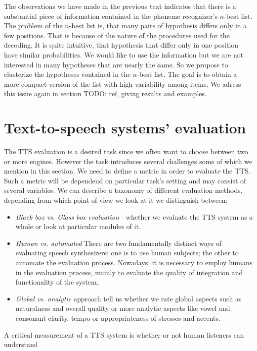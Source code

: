 \par
The observations we have made in the previous text indicates that there is a substantial piece of information contained in the phoneme recognizer's $n$-best list.
The problem of the $n$-best list is, that many pairs of hypothesis differs only in a few positions.
That is because of the nature of the procedures used for the decoding.
It is quite intuitive, that hypothesis that differ only in one position have similar probabilities.
We would like to use the information but we are not interested in many hypotheses that are nearly the same.
So we propose to clusterize the hypotheses contained in the $n$-best list.
The goal is to obtain a more compact version of the list with high variability among items.
We adress this issue again in section TODO: ref, giving results and examples.  
\section{Text-to-speech systems' evaluation}
\label{tts-eval}
The TTS evaluation\cite{huang2001spoken} is a desired task since we often want to choose between two or more engines.
However the task introduces several challenges some of which we mention in this section.
We need to define a metric in order to evaluate the TTS.
Such a metric will be dependend on particular task's setting and may consist of several variables.
We can describe a taxonomy of different evaluation methods, depending from which point of view we look at it we distinguish between:
\begin{itemize}
\item \textit{Black box vs. Glass box evaluation} - whether we evaluate the TTS system as a whole or look at particular modules of it.
\item \textit{Human vs. automated} There are two fundamentally distinct ways of evaluating
speech synthesizers: one is to use human subjects; the other to automate the evaluation process.
Nowadays, it is necessary to employ humans in the evaluation process, mainly to evaluate the quality of integration and functionality of the system.
\item \textit{Global vs. analytic} approach tell us whether we rate global aspects such as naturalness and overall quality or more analytic aspects like vowel and consonant clarity, tempo or appropriateness of stresses and accents.
\end{itemize}
\par
A critical measurement of a TTS system is whether or not human listeners can understand
